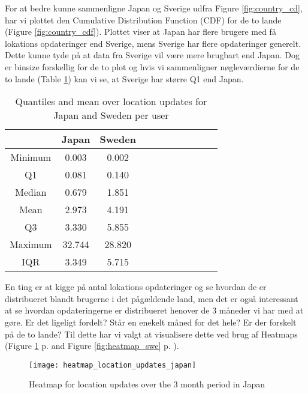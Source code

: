 For at bedre kunne sammenligne Japan og Sverige udfra Figure \ref{fig:country_cd}, har vi plottet den Cumulative Distribution Function (CDF) for de to lande (Figure \ref{fig:country_cdf}). Plottet viser at Japan har flere brugere med få lokations opdateringer end Sverige, mens Sverige har flere opdateringer generelt. Dette kunne tyde på at data fra  Sverige vil være mere brugbart end Japan. Dog er binsize forskellig for de to plot og hvis vi sammenligner nøgleværdierne for de to lande (Table \ref{tab:stat_loc_updates}) kan vi se, at Sverige har større Q1 end Japan.

\begin{table}[htbp]
        \centering
        \small
        \setlength\tabcolsep{2pt}
        \begin{tabular}{|c|c|c|c|c|c|c|c|c|c|c|}
            \hline
                         & Japan      &   Sweden      \\[-3pt]
            \hline
                 Minimum &    0.003       &   0.002          \\
            \hline
                 Q1      &  0.081     &   0.140      \\
            \hline
                 Median  & 0.679     &   1.851      \\
            \hline
                 Mean    &  2.973   &  4.191     \\
            \hline
                 Q3      & 3.330    &   5.855     \\
            \hline
                 Maximum &  32.744 &  28.820     \\
            \hline
                 IQR     &  3.349   &  5.715      \\
            \hline
            
        \end{tabular}
        \caption{Quantiles and mean over location updates for Japan and Sweden per user} %
        \label{tab:stat_loc_updates}
\end{table}


En ting er at kigge på antal lokations opdateringer og se hvordan de er distribueret blandt brugerne i det pågældende land, men det er også interessant at se hvordan opdateringerne er distribueret henover de 3 måneder vi har med at gøre. Er det ligeligt fordelt? Står en enekelt måned for det hele? Er der forskelt på de to lande? Til dette har vi valgt at visualisere dette ved brug af Heatmaps (Figure \ref{fig:heatmap_jap} p.  \pageref{fig:heatmap_jap} and Figure \ref{fig:heatmap_swe} p. \pageref{fig:heatmap_swe}). 
\begin{figure}[H]
    \centering
    \texttt{[image: heatmap\_location\_updates\_japan]}
    \caption{Heatmap for location updates over the 3 month period in Japan}
    \label{fig:heatmap_jap}
\end{figure}


